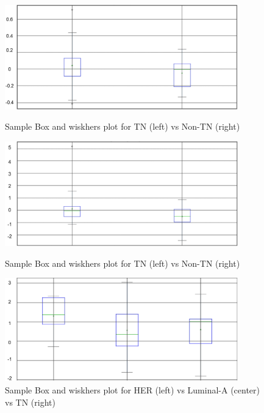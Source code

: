 \documentclass[final,1p,times,twocolumn]{elsarticle}
\begin{document}
\begin{figure}
    \centering
    \begin{minipage}{0.45\textwidth}
        \centering
        \includegraphics[width=0.9\textwidth]{bg1.png} %
        \caption{Sample Box and wiskhers plot for TN (left) vs Non-TN (right)}
        \label{b1}
    \end{minipage}\hfill
    \begin{minipage}{0.45\textwidth}
        \centering
        \includegraphics[width=0.9\textwidth]{bg2.png} %
        \caption{Sample Box and wiskhers plot for TN (left) vs Non-TN (right)}
        \label{b2}
    \end{minipage}
    \begin{minipage}{0.45\textwidth}
        \centering
        \includegraphics[width=0.9\textwidth]{tg1.png} %
        \caption{Sample Box and wiskhers plot for HER (left) vs Luminal-A (center) vs TN (right)}

\end{minipage}
\end{figure}
\end{document}
